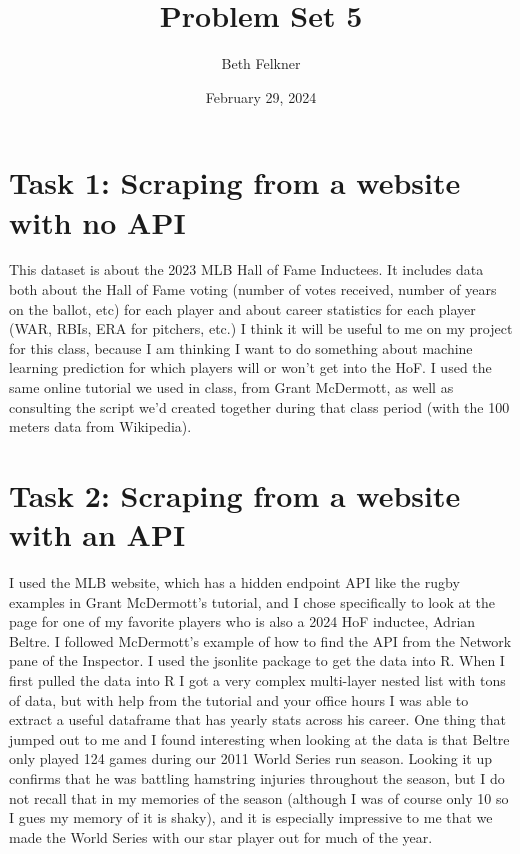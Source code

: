\documentclass{article}
\title{Problem Set 5}
\author{Beth Felkner}
\date{February 29, 2024}
\begin{document}
\maketitle

\section{Task 1: Scraping from a website with no API}
This dataset is about the 2023 MLB Hall of Fame Inductees. It includes data both about the Hall of Fame voting (number of votes received, number of years on the ballot, etc) for each player and about career statistics for each player (WAR, RBIs, ERA for pitchers, etc.) I think it will be useful to me on my project for this class, because I am thinking I want to do something about machine learning prediction for which players will or won't get into the HoF. I used the same online tutorial we used in class, from Grant McDermott, as well as consulting the script we'd created together during that class period (with the 100 meters data from Wikipedia).

\section{Task 2: Scraping from a website with an API}
I used the MLB website, which has a hidden endpoint API like the rugby examples in Grant McDermott's tutorial, and I chose specifically to look at the page for one of my favorite players who is also a 2024 HoF inductee, Adrian Beltre. I followed McDermott's example of how to find the API from the Network pane of the Inspector. I used the jsonlite package to get the data into R. When I first pulled the data into R I got a very complex multi-layer nested list with tons of data, but with help from the tutorial and your office hours I was able to extract a useful dataframe that has yearly stats across his career. One thing that jumped out to me and I found interesting when looking at the data is that Beltre only played 124 games during our 2011 World Series run season. Looking it up confirms that he was battling hamstring injuries throughout the season, but I do not recall that in my memories of the season (although I was of course only 10 so I gues my memory of it is shaky), and it is especially impressive to me that we made the World Series with our star player out for much of the year. 
\end{document}
